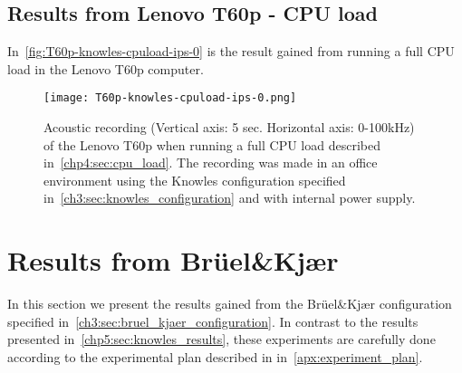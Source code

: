 \subsection{Results from Lenovo T60p - CPU load}\label{chp5:subsec:t60p_knowles_results_cpuload}
In~\autoref{fig:T60p-knowles-cpuload-ips-0} is the result gained from running a full CPU load in the Lenovo T60p computer. 
\begin{figure}[ht]
    \centering
    \texttt{[image: T60p-knowles-cpuload-ips-0.png]}
    \caption{Acoustic recording (Vertical axis: 5 sec. Horizontal axis: 0-100kHz) of the Lenovo T60p when running a full CPU load described in~\autoref{chp4:sec:cpu_load}. The recording was made in an office environment using the Knowles configuration specified in~\autoref{ch3:sec:knowles_configuration} and with internal power supply. }
    \label{fig:T60p-knowles-cpuload-ips-0}
\end{figure}

\section{Results from Brüel\&Kjær}\label{chp5:sec:bk_results}
In this section we present the results gained from the Brüel\&Kjær configuration specified in~\autoref{ch3:sec:bruel_kjaer_configuration}. 
In contrast to the results presented in~\autoref{chp5:sec:knowles_results}, these experiments are carefully done according to the experimental plan described in in~\autoref{apx:experiment_plan}. 

